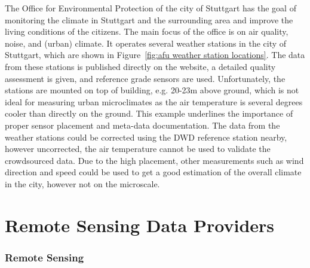 The Office for Environmental Protection of the city of Stuttgart has the goal of monitoring the climate in Stuttgart and the surrounding area and improve the living conditions of the citizens. The main focus of the office is on air quality, noise, and (urban) climate. It operates several weather stations in the city of Stuttgart, which are shown in Figure~\ref{fig:afu weather station locations}. The data from these stations is published directly on the website, a detailed quality assessment is given, and reference grade sensors are used. Unfortunately, the stations are mounted on top of building, e.g. 20-23m above ground, which is not ideal for measuring urban microclimates as the air temperature is several degrees cooler than directly on the ground. This example underlines the importance of proper sensor placement and meta-data documentation. The data from the weather stations could be corrected using the DWD reference station nearby, however uncorrected, the air temperature cannot be used to validate the crowdsourced data. Due to the high placement, other measurements such as wind direction and speed could be used to get a good estimation of the overall climate in the city, however not on the microscale.


\section{Remote Sensing Data Providers}

\subsubsection{Remote Sensing}
\label{subsec: remote sensing}

